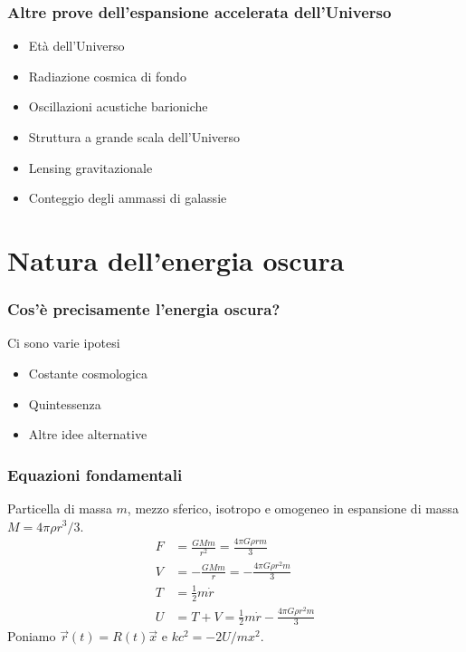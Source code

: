 \begin{frame}
  \frametitle{Altre prove dell'espansione accelerata dell'Universo}
  \begin{itemize}
  \item Età dell'Universo
  \item Radiazione cosmica di fondo
  \item Oscillazioni acustiche barioniche
  \item Struttura a grande scala dell'Universo
  \item Lensing gravitazionale
  \item Conteggio degli ammassi di galassie
  \end{itemize}
\end{frame}

\section[Natura]{Natura dell'energia oscura}

\begin{frame}
  \frametitle{Cos'è precisamente l'energia oscura?}
  Ci sono varie ipotesi
  \begin{itemize}
  \item Costante cosmologica
  \item Quintessenza
  \item Altre idee alternative
  \end{itemize}
\end{frame}

\begin{frame}
  \frametitle[]{Equazioni fondamentali}
  Particella di massa $m$, mezzo sferico, \alert{isotropo e omogeneo} in
  espansione di massa $M = 4\pi\rho r^3/3$.
  \begin{align*}
    F &= \frac{GMm}{r^2} = \frac{4\pi G \rho r m}{3} \\
    V &= -\frac{GMm}{r} = -\frac{4\pi G \rho r^2 m}{3} \\
    T &= \frac{1}{2}m\dot{r} \\
    U &= T + V = \frac{1}{2}m\dot{r} - \frac{4\pi G \rho r^2 m}{3}
  \end{align*}
  Poniamo $\vec{r}(t) = R(t)\vec{x}$ e $kc^2 = -2U/mx^2$.
\end{frame}

